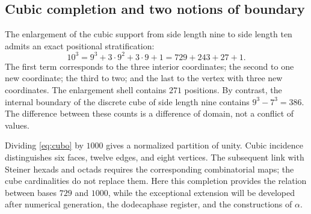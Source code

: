 \subsection{Cubic completion and two notions of boundary}

The enlargement of the cubic support from side length nine to side length ten admits an exact positional stratification:
\begin{equation}
 10^3=9^3+3\cdot9^2+3\cdot9+1=729+243+27+1.
 \label{eq:cubo}
\end{equation}
The first term corresponds to the three interior coordinates; the second to one new coordinate; the third to two; and the last to the vertex with three new coordinates. The enlargement shell contains \(271\) positions. By contrast, the internal boundary of the discrete cube of side length nine contains \(9^3-7^3=386\). The difference between these counts is a difference of domain, not a conflict of values.

Dividing \eqref{eq:cubo} by \(1000\) gives a normalized partition of unity. Cubic incidence distinguishes six faces, twelve edges, and eight vertices. The subsequent link with Steiner hexads and octads requires the corresponding combinatorial maps; the cube cardinalities do not replace them. Here this completion provides the relation between bases \(729\) and \(1000\), while the exceptional extension will be developed after numerical generation, the dodecaphase register, and the constructions of \(\alpha\).





